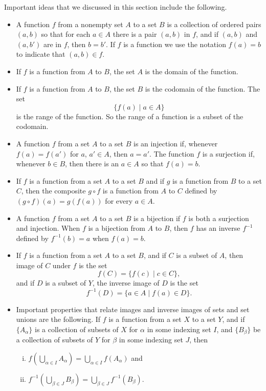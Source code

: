 Important ideas that we discussed in this section include the following.
\begin{itemize}
\item A function $f$ from a nonempty set $A$ to a set $B$ is a collection of ordered pairs $(a,b)$ so that for each $a \in A$ there is a pair $(a,b)$ in $f$, and if $(a,b)$ and $(a,b')$ are in $f$, then $b=b'$.  If $f$ is a function we use the notation $f(a) = b$ to indicate that $(a,b) \in f$. 
\item If $f$ is a function from $A$ to $B$, the set $A$ is the domain of the function.
\item If $f$ is a function from $A$ to $B$, the set $B$ is the codomain of the function. The set 
\[\{f(a) \mid a \in A\}\]
 is the range of the function. So the range of a function is a subset of the codomain.  
\item A function $f$ from a set $A$ to a set $B$ is an injection if, whenever $f(a) = f(a')$ for $a$, $a' \in A$, then $a = a'$. The function $f$ is a surjection if, whenever $b \in B$, then there is an $a \in A$ so that $f(a)=b$. 
\item If $f$ is a function from a set $A$ to a set $B$ and if $g$ is a function from $B$ to a set $C$, then the composite $g \circ f$ is a function from $A$ to $C$ defined by $(g \circ f)(a) = g(f(a))$ for every $a \in A$. 
\item A function $f$ from a set $A$ to a set $B$ is a bijection if $f$ is both a surjection and injection. When $f$ is a bijection from $A$ to $B$, then $f$ has an inverse $f^{-1}$ defined by $f^{-1}(b) = a$ when $f(a) = b$. 
\item If $f$ is a function from a set $A$ to a set $B$, and if $C$ is a subset of $A$, then image of $C$ under $f$ is the set 
\[f(C) = \{f(c) \mid c \in C\},\]
and if $D$ is a subset of $Y$, the inverse image of $D$ is the set 
\[f^{-1}(D) = \{a \in A \mid f(a) \in D\}.\]
\item Important properties that relate images and inverse images of sets and set unions are the following. If $f$ is a function from a set $X$ to a set $Y$, and if $\{A_{\alpha}\}$ is a collection of subsets of $X$ for $\alpha$ in some indexing set $I$, and $\{B_{\beta}\}$ be a collection of subsets of $Y$ for $\beta$ in some indexing set $J$, then  
\begin{enumerate}[i.]
\item $f\left(\bigcup_{\alpha \in I} A_{\alpha}\right) = \bigcup_{\alpha \in I} f(A_{\alpha})$ and
\item $f^{-1}\left(\bigcup_{\beta \in J} B_{\beta}\right) = \bigcup_{\beta \in J} f^{-1}(B_{\beta})$.
\end{enumerate}
\end{itemize}

